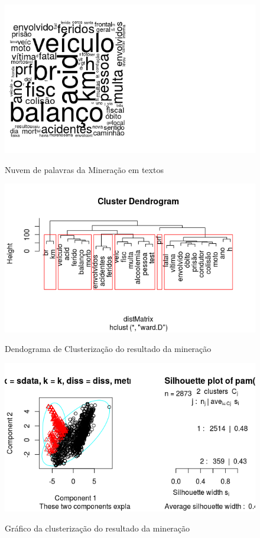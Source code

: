 \begin{figure}
\centering
\caption{Nuvem de palavras da Mineração em textos}
\includegraphics[width=0.7\linewidth]{Figuras/Twitter//Nuvem1}
\label{fig:Nuvem1}
\end{figure}


\pagebreak

\begin{figure}
\centering
\caption{Dendograma de Clusterização do resultado da mineração}
\includegraphics[width=0.7\linewidth]{Figuras/Twitter//Cluster}
\label{fig:Cluster}
\end{figure}


\begin{figure}
\centering
\caption{Gráfico da clusterização do resultado da mineração}
\includegraphics[width=0.7\linewidth]{Figuras/Twitter/Cluster2}
\label{fig:Cluster2}
\end{figure}



